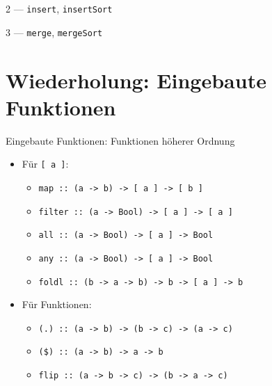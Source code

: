 \documentclass{beamer}
\newcommand{\code}[1]{
	\begin{mdframed}
		
	\end{mdframed}
}
\begin{document}
\begin{frame}{2 --- \texttt{insert}, \texttt{insertSort}}
	\code{demos/Sort1.hs}
\end{frame}

\begin{frame}{3 --- \texttt{merge}, \texttt{mergeSort}}
	\code{demos/Sort2.hs}
\end{frame}

\section{Wiederholung: Eingebaute Funktionen}

\begin{frame}{Eingebaute Funktionen: Funktionen höherer Ordnung}
	\begin{itemize}
		\item Für \texttt{[ a ]}:
		\begin{itemize}
			\item \texttt{map :: (a -> b) -> [ a ] -> [ b ]}
			\item \texttt{filter :: (a -> Bool) -> [ a ] -> [ a ]}
			\item \texttt{all :: (a -> Bool) -> [ a ] -> Bool}
			\item \texttt{any :: (a -> Bool) -> [ a ] -> Bool}
			\item \texttt{foldl :: (b -> a -> b) -> b -> [ a ] -> b}
		\end{itemize}
		\item Für Funktionen:
		\begin{itemize}
			\item \texttt{(.) :: (a -> b) -> (b -> c) -> (a -> c)}
			\item \texttt{(\$) :: (a -> b) -> a -> b}
			\item \texttt{flip :: (a -> b -> c) -> (b -> a -> c)}
		\end{itemize}
	\end{itemize}
\end{frame}
\end{document}
